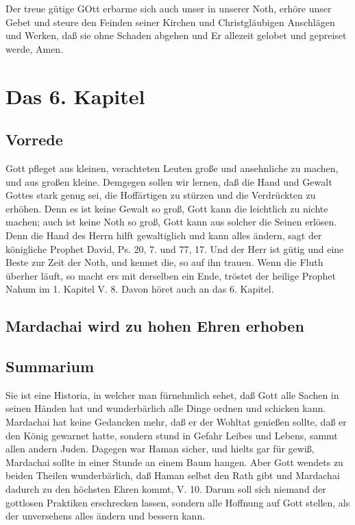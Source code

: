 Der treue gütige GOtt erbarme sich auch unser in unserer Noth, erhöre unser Gebet und steure den Feinden seiner Kirchen und Christgläubigen Anschlägen und Werken, daß sie ohne Schaden abgehen und Er allezeit gelobet und gepreiset werde, Amen.

\chapter{Das 6. Kapitel}

\section{Vorrede}

Gott pfleget aus kleinen, verachteten Leuten große und ansehnliche zu machen, und aus großen kleine. Demgegen sollen wir lernen, daß die Hand und Gewalt Gottes stark genug sei, die Hoffärtigen zu stürzen und die Verdrückten zu erhöhen. Denn es ist keine Gewalt so groß, Gott kann die leichtlich zu nichte machen; auch ist keine Noth so groß, Gott kann aus solcher die Seinen erlösen. Denn die Hand des Herrn hilft gewaltiglich und kann alles ändern, sagt der königliche Prophet David, Ps. 20, 7. und 77, 17. Und der Herr ist gütig und eine Beste zur Zeit der Noth, und kennet die, so auf ihn trauen. Wenn die Fluth überher läuft, so macht ers mit derselben ein Ende, tröstet der heilige Prophet Nahum im 1. Kapitel V. 8. Davon höret auch an das 6. Kapitel.


\section{Mardachai wird zu hohen Ehren erhoben}

\section{Summarium}

Sie ist eine Historia, in welcher man fürnehmlich sehet, daß Gott alle Sachen in seinen Händen hat und wunderbärlich alle Dinge ordnen und schicken kann. Mardachai hat keine Gedancken mehr, daß er der Wohltat genießen sollte, daß er den König gewarnet hatte, sondern stund in Gefahr Leibes und Lebens, sammt allen andern Juden. Dagegen war Haman sicher, und hielts gar für gewiß, Mardachai sollte in einer Stunde an einem Baum hangen. Aber Gott wendets zu beiden Theilen wunderbärlich, daß Haman selbst den Rath gibt und Mardachai dadurch zu den höchsten Ehren kommt, V. 10. Darum soll sich niemand der gottlosen Praktiken erschrecken lassen, sondern alle Hoffnung auf Gott stellen, als der unversehens alles ändern und bessern kann.

